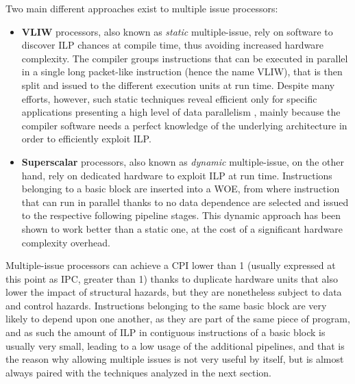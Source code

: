 Two main different approaches exist to multiple issue processors:
\begin{itemize}
  \item \textbf{VLIW} processors, also known as \emph{static} multiple-issue, rely on software to discover \ac{ILP} chances at compile time, thus avoiding increased hardware complexity. The compiler groups instructions that can be executed in parallel in a single long packet-like instruction (hence the name VLIW), that is then split and issued to the different execution units at run time. Despite many efforts, however, such static techniques reveal efficient only for specific applications presenting a high level of data parallelism \cite[p.~168]{hennessy17}, mainly because the compiler software needs a perfect knowledge of the underlying architecture in order to efficiently exploit \ac{ILP}.
  \item \textbf{Superscalar} processors, also known as \emph{dynamic} multiple-issue, on the other hand, rely on dedicated hardware to exploit \ac{ILP} at run time. Instructions belonging to a basic block are inserted into a \ac{WOE}, from where instruction that can run in parallel thanks to no data dependence are selected and issued to the respective following pipeline stages. This dynamic approach has been shown to work better than a static one, at the cost of a significant hardware complexity overhead.
\end{itemize}

Multiple-issue processors can achieve a \ac{CPI} lower than 1 (usually expressed at this point as \ac{IPC}, greater than 1) thanks to duplicate hardware units that also lower the impact of structural hazards, but they are nonetheless subject to data and control hazards. Instructions belonging to the same basic block are very likely to depend upon one another, as they are part of the same piece of program, and as such the amount of \ac{ILP} in contiguous instructions of a basic block is usually very small, leading to a low usage of the additional pipelines, and that is the reason why allowing multiple issues is not very useful by itself, but is almost always paired with the techniques analyzed in the next section.

